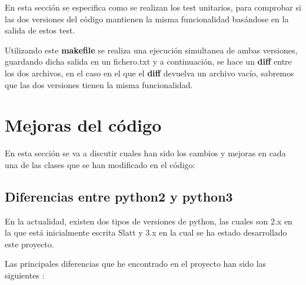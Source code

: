 \documentclass{cosas/tfg_domingo}
\begin{document}
En esta sección se especifica como se realizan los test unitarios, para comprobar si las dos versiones del código mantienen la misma funcionalidad basándose en la salida de estos test.

\hfill



Utilizando este \textbf{makefile} se realiza una ejecución simultanea de ambas versiones, guardando dicha salida en un fichero.txt y a continuación, se hace un \textbf{diff} entre los dos archivos, en el caso en el que el \textbf{diff} devuelva un archivo vacío, sabremos que las dos versiones tienen la misma funcionalidad.

\newpage

\section{Mejoras del código}
En esta sección se va a discutir cuales han sido los cambios y mejoras en cada una de las clases que se han modificado en el código:

\subsection{Diferencias entre python2 y python3}

En la actualidad, existen dos tipos de versiones de python, las cuales son 2.x en la que está inicialmente escrita Slatt y 3.x en la cual se ha estado desarrollado este proyecto.

Las principales diferencias que he encontrado en el proyecto han sido las siguientes \citet{diferencias}:
\end{document}
